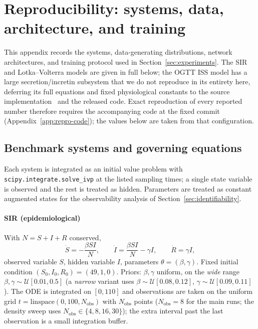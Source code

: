\section{Reproducibility: systems, data, architecture, and training}
\label{app:repro}

This appendix records the systems, data-generating distributions, network architectures, and training
protocol used in Section~\ref{sec:experiments}. The SIR and Lotka--Volterra models are given in full
below; the OGTT ISS model has a large secretion/incretin subsystem that we do not reproduce in its
entirety here, deferring its full equations and fixed physiological constants to the source
implementation~\cite{ha2024iss} and the released code. Exact reproduction of every reported number
therefore requires the accompanying code at the fixed commit (Appendix~\ref{app:repro-code}); the values
below are taken from that configuration.

\subsection{Benchmark systems and governing equations}
\label{app:repro-systems}

Each system is integrated as an initial value problem with \texttt{scipy.integrate.solve\_ivp} at the
listed sampling times; a single state variable is observed and the rest is treated as hidden. Parameters
are treated as constant augmented states for the observability analysis of Section~\ref{sec:identifiability}.

\paragraph{SIR (epidemiological)} With $N=S+I+R$ conserved,
\[
\dot S=-\frac{\beta S I}{N},\qquad
\dot I=\frac{\beta S I}{N}-\gamma I,\qquad
\dot R=\gamma I,
\]
observed variable $S$, hidden variable $I$, parameters $\theta=(\beta,\gamma)$. Fixed initial condition
$(S_0,I_0,R_0)=(49,1,0)$. Priors: $\beta,\gamma$ uniform, on the \emph{wide} range
$\beta,\gamma\sim\mathcal{U}[0.01,0.5]$ (a \emph{narrow} variant uses $\beta\sim\mathcal{U}[0.08,0.12]$,
$\gamma\sim\mathcal{U}[0.09,0.11]$). The ODE is integrated on $[0,110]$ and observations are taken on the
uniform grid $t=\mathrm{linspace}(0,100,N_\mathrm{obs})$ with $N_\mathrm{obs}$ points ($N_\mathrm{obs}=8$ for
the main runs; the density sweep uses $N_\mathrm{obs}\in\{4,8,16,30\}$); the extra interval past the last
observation is a small integration buffer.

